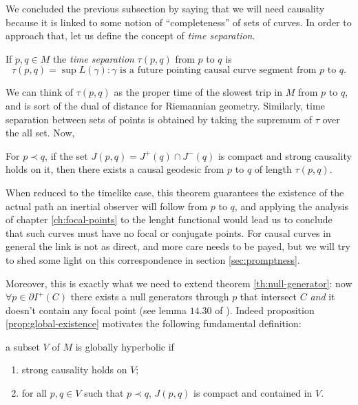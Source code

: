We concluded the previous subsection by saying that we will need causality because it is linked to some notion of ``completeness'' of sets of curves. In order to approach that, let us define the concept of \emph{time separation}.
\begin{definition}
	If \(p,q\in M\) the \emph{time separation} \(\tau (p,q)\) from \(p\) to \(q\) is
	\[
		\tau (p,q) = \sup{L(\gamma): \gamma\text{ is a future pointing causal curve segment from } p \text{ to } q}.
	\]
\end{definition}
We can think of \(\tau (p,q)\) as the proper time of the slowest trip in \(M\) from \(p\) to \(q\), and is sort of the dual of distance for Riemannian geometry.
Similarly, time separation between sets of points is obtained by taking the supremum of \(\tau\) over the all set. Now,
\begin{prop}
	\label{prop:global-existence}
	For \(p \prec q\), if the set \(J(p, q) = J^+(q) \cap J^-(q)\) is compact and strong causality holds on it, then there exists a causal geodesic from \(p\) to \(q\) of length \(\tau (p,q)\).
\end{prop}
When reduced to the timelike case, this theorem guarantees the existence of the actual path an inertial observer will follow from \(p\) to \(q\), and applying the analysis of chapter \ref{ch:focal-points} to the lenght functional would lead us to conclude that such curves must have no focal or conjugate points. For causal curves in general the link is not as direct, and more care needs to be payed, but we will try to shed some light on this correspondence in section \ref{sec:promptness}.

Moreover, this is exactly what we need to extend theorem \ref{th:null-generator}: now \(\forall p\in \partial I^+(C)\)  there exists a null generators through \(p\) that intersect \(C\) \emph{and} it doesn't contain any focal point (see lemma \(14.30\) of \cite{o1983semi}).
Indeed proposition \ref{prop:global-existence} motivates the following fundamental definition:
\begin{definition}
	\label{def:global-hyper}
	a subset \(V\) of \(M\) is globally hyperbolic if 
	\begin{enumerate}
		\item strong causality holds on \(V\);
  		\item for all \(p, q \in V\) such that \(p \prec q\), \(J(p,q)\) is compact and contained in \(V\).
	\end{enumerate}
\end{definition}

